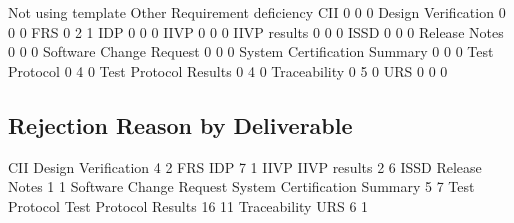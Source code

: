 \documentclass{article}
\begin{document}
\begin{Schunk}
\begin{Soutput}
                               Not using template Other Requirement deficiency
  CII                                           0     0                      0
  Design Verification                           0     0                      0
  FRS                                           0     2                      1
  IDP                                           0     0                      0
  IIVP                                          0     0                      0
  IIVP results                                  0     0                      0
  ISSD                                          0     0                      0
  Release Notes                                 0     0                      0
  Software Change Request                       0     0                      0
  System Certification Summary                  0     0                      0
  Test Protocol                                 0     4                      0
  Test Protocol Results                         0     4                      0
  Traceability                                  0     5                      0
  URS                                           0     0                      0
\end{Soutput}
\end{Schunk}


\subsection{Rejection Reason by Deliverable}

\begin{Schunk}
\begin{Soutput}
                         CII          Design Verification 
                           4                            2 
                         FRS                          IDP 
                           7                            1 
                        IIVP                 IIVP results 
                           2                            6 
                        ISSD                Release Notes 
                           1                            1 
     Software Change Request System Certification Summary 
                           5                            7 
               Test Protocol        Test Protocol Results 
                          16                           11 
                Traceability                          URS 
                           6                            1 
\end{Soutput}
\end{Schunk}
\end{document}
